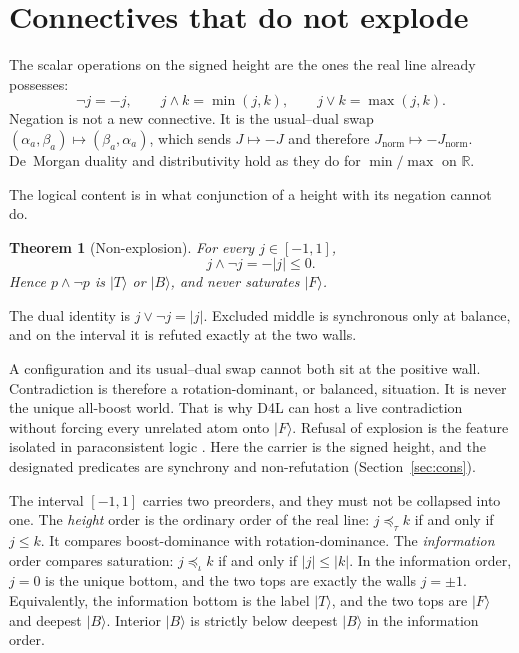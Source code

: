 \documentclass[a4paper]{article}
\newtheorem{theorem}{Theorem}[section]
\theoremstyle{definition}
\newcommand{\Jnorm}{J_{\mathrm{norm}}}
\begin{document}
\section{Connectives that do not explode}
\label{sec:conn}

The scalar operations on the signed height are the ones the real line
already possesses:
\[
\neg j = -j,\qquad
j\wedge k = \min(j,k),\qquad
j\vee k = \max(j,k).
\]
Negation is not a new connective. It is the usual--dual swap
\((\alpha_a,\beta_a)\mapsto(\beta_a,\alpha_a)\), which sends
\(J\mapsto -J\) and therefore \(\Jnorm\mapsto-\Jnorm\). De~Morgan
duality and distributivity hold as they do for \(\min/\max\) on
\(\mathbb{R}\).

The logical content is in what conjunction of a height with its
negation cannot do.

\begin{theorem}[Non-explosion]
\label{thm:nexplosion}
For every \(j\in[-1,1]\),
\[
j\wedge\neg j = -|j|\le 0.
\]
Hence \(p\wedge\neg p\) is \(\lvert T\rangle\) or \(\lvert B\rangle\),
and never saturates \(\lvert F\rangle\).
\end{theorem}

The dual identity is \(j\vee\neg j=\lvert j\rvert\). Excluded middle
is synchronous only at balance, and on the interval it is refuted
exactly at the two walls.

A configuration and its usual--dual swap cannot both sit at the
positive wall. Contradiction is therefore a rotation-dominant, or
balanced, situation. It is never the unique all-boost world. That is
why D4L can host a live contradiction without forcing every unrelated
atom onto \(\lvert F\rangle\). Refusal of explosion is the feature
isolated in paraconsistent logic \cite{Priest2006}. Here the carrier
is the signed height, and the designated predicates are synchrony and
non-refutation (Section~\ref{sec:cons}).

The interval \([-1,1]\) carries two preorders, and they must not be
collapsed into one. The \emph{height} order is the ordinary order of
the real line: \(j\preceq_\tau k\) if and only if \(j\le k\). It
compares boost-dominance with rotation-dominance. The
\emph{information} order compares saturation: \(j\preceq_\iota k\) if
and only if \(\lvert j\rvert\le\lvert k\rvert\). In the information
order, \(j=0\) is the unique bottom, and the two tops are exactly the
walls \(j=\pm 1\). Equivalently, the information bottom is the label
\(\lvert T\rangle\), and the two tops are \(\lvert F\rangle\) and
deepest \(\lvert B\rangle\). Interior \(\lvert B\rangle\) is strictly
below deepest \(\lvert B\rangle\) in the information order.
\end{document}
